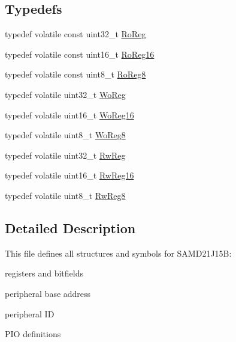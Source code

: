 \subsection*{Typedefs}
\begin{DoxyCompactItemize}
\item 
typedef volatile const uint32\+\_\+t \mbox{\hyperlink{group___s_a_m_d21_j15_b__definitions_ga5d556f8391af4141be23f7334ac9dd68}{Ro\+Reg}}
\item 
typedef volatile const uint16\+\_\+t \mbox{\hyperlink{group___s_a_m_d21_j15_b__definitions_gaebf6e33c2d49a802e06e22a95ea9d0d0}{Ro\+Reg16}}
\item 
typedef volatile const uint8\+\_\+t \mbox{\hyperlink{group___s_a_m_d21_j15_b__definitions_ga0d957f1433aaf5d70e4dc2b68288442d}{Ro\+Reg8}}
\item 
typedef volatile uint32\+\_\+t \mbox{\hyperlink{group___s_a_m_d21_j15_b__definitions_gac0f96d4e8018367b38f527007cf0eafd}{Wo\+Reg}}
\item 
typedef volatile uint16\+\_\+t \mbox{\hyperlink{group___s_a_m_d21_j15_b__definitions_ga0ab0e5f6c8301aa1c2068e511d854094}{Wo\+Reg16}}
\item 
typedef volatile uint8\+\_\+t \mbox{\hyperlink{group___s_a_m_d21_j15_b__definitions_ga5e336e5a36ee12ebeafb021108e5275b}{Wo\+Reg8}}
\item 
typedef volatile uint32\+\_\+t \mbox{\hyperlink{group___s_a_m_d21_j15_b__definitions_gacf1496e3bbe303e55f627fc7558a68c7}{Rw\+Reg}}
\item 
typedef volatile uint16\+\_\+t \mbox{\hyperlink{group___s_a_m_d21_j15_b__definitions_gacce07556c80fc352ae607f225f19fed5}{Rw\+Reg16}}
\item 
typedef volatile uint8\+\_\+t \mbox{\hyperlink{group___s_a_m_d21_j15_b__definitions_gae361754be775bb192f85821d3ab33c17}{Rw\+Reg8}}
\end{DoxyCompactItemize}


\subsection{Detailed Description}
This file defines all structures and symbols for S\+A\+M\+D21\+J15B\+:
\begin{DoxyItemize}
\item registers and bitfields
\item peripheral base address
\item peripheral ID
\item P\+IO definitions 
\end{DoxyItemize}

